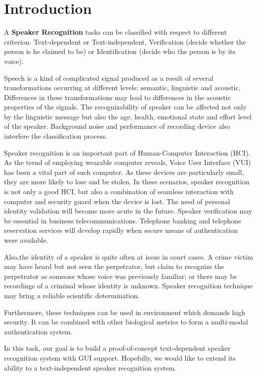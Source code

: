 
\section{Introduction}
A \textbf{Speaker Recognition} tasks can be classified with respect to different criterion:
Text-dependent or Text-independent, Verification (decide whether the person is he claimed to be) or Identification (decide who the person is by its voice).\cite{SRwiki}

Speech is a kind of complicated signal produced as a result of several transformations occurring at different levels: semantic, linguistic and acoustic.
Differences in these transformations may lead to differences in the acoustic properties of the signals.
The recognizability of speaker can be affected not only by the linguistic message
but also the age, health, emotional state and effort level of the speaker.
Background noise and performance of recording device also interfere
the classification process.

Speaker recognition is an important part of Human-Computer Interaction (HCI).
As the trend of employing wearable computer reveals,
Voice User Interface (VUI) has been a vital part of such computer.
As these devices are particularly small, they are more likely to lose and be stolen.
In these scenarios, speaker recognition is not only a good HCI,
but also a combination of seamless interaction with computer and security guard
when the device is lost.
The need of personal identity validation will become more acute in the future.
Speaker verification may be essential in business telecommunications.
Telephone banking and telephone reservation services will develop rapidly
when secure means of authentication were available.

Also,the identity of a speaker is quite often at issue in court cases.
A crime victim may have heard but not seen the perpetrator,
but claim to recognize the perpetrator as someone whose voice was previously familiar;
or there may be recordings of a criminal whose identity is unknown.
Speaker recognition technique may bring a reliable scientific determination.

Furthermore, these techniques can be used in environment which demands high security.
It can be combined with other biological metrics to form a multi-modal authentication system.

In this task, our goal is to build a proof-of-concept text-dependent speaker recognition system with GUI support.
Hopefully, we would like to extend its ability to a text-independent speaker recognition system.
